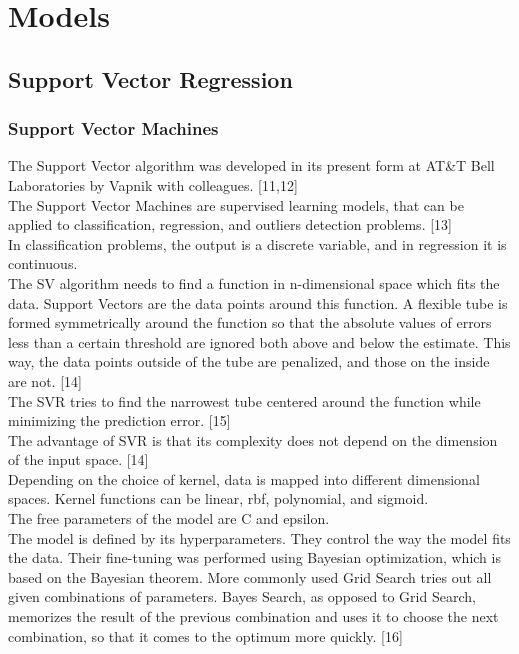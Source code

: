 \documentclass[times, utf8, zavrsni, english]{fer}
\begin{document}
\chapter{Models}

\section{Support Vector Regression}
\subsection{Support Vector Machines}
The Support Vector algorithm was developed in its present form at AT\&T Bell Laboratories by Vapnik with colleagues. [11,12] \\

The Support Vector Machines are supervised learning models, that can be applied to classification, regression, and outliers detection problems. [13] \\
In classification problems, the output is a discrete variable, and in regression it is continuous. \\
The SV algorithm needs to find a function in n-dimensional space which fits the data. 
Support Vectors are the data points around this function. A flexible tube is formed symmetrically around the function so that the absolute values of errors less than a certain threshold are ignored both above and below the estimate. This way, the data points outside of the tube are penalized, and those on the inside are not. [14] \\
The SVR tries to find the narrowest tube centered around the function while minimizing the prediction error. [15] \\

The advantage of SVR is that its complexity does not depend on the dimension of the input space. [14] \\

Depending on the choice of kernel, data is mapped into different dimensional spaces. Kernel functions can be linear, rbf, polynomial, and sigmoid. \\
The free parameters of the model are C and epsilon. \\
The model is defined by its hyperparameters. They control the way the model fits the data. Their fine-tuning was performed using Bayesian optimization, which is based on the Bayesian theorem. More commonly used Grid Search tries out all given combinations of parameters. Bayes Search, as opposed to Grid Search, memorizes the result of the previous combination and uses it to choose the next combination, so that it comes to the optimum more quickly. [16] \\
\end{document}
